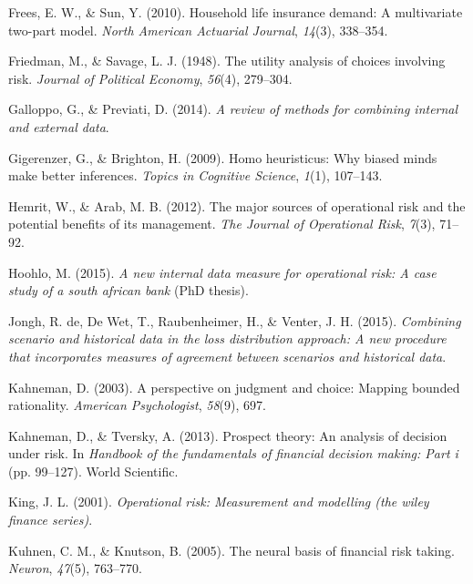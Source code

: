 \documentclass{DissertateUSU}
\begin{document}
\leavevmode\hypertarget{ref-frees2010household}{}%
Frees, E. W., \& Sun, Y. (2010). Household life insurance demand: A
multivariate two-part model. \emph{North American Actuarial Journal},
\emph{14}(3), 338--354.

\leavevmode\hypertarget{ref-friedman1948utility}{}%
Friedman, M., \& Savage, L. J. (1948). The utility analysis of choices
involving risk. \emph{Journal of Political Economy}, \emph{56}(4),
279--304.

\leavevmode\hypertarget{ref-galloppo2014review}{}%
Galloppo, G., \& Previati, D. (2014). \emph{A review of methods for
combining internal and external data}.

\leavevmode\hypertarget{ref-gigerenzer2009homo}{}%
Gigerenzer, G., \& Brighton, H. (2009). Homo heuristicus: Why biased
minds make better inferences. \emph{Topics in Cognitive Science},
\emph{1}(1), 107--143.

\leavevmode\hypertarget{ref-hemrit2012major}{}%
Hemrit, W., \& Arab, M. B. (2012). The major sources of operational risk
and the potential benefits of its management. \emph{The Journal of
Operational Risk}, \emph{7}(3), 71--92.

\leavevmode\hypertarget{ref-hoohlo2015new}{}%
Hoohlo, M. (2015). \emph{A new internal data measure for operational
risk: A case study of a south african bank} (PhD thesis).

\leavevmode\hypertarget{ref-de2015combining}{}%
Jongh, R. de, De Wet, T., Raubenheimer, H., \& Venter, J. H. (2015).
\emph{Combining scenario and historical data in the loss distribution
approach: A new procedure that incorporates measures of agreement
between scenarios and historical data}.

\leavevmode\hypertarget{ref-kahneman2003perspective}{}%
Kahneman, D. (2003). A perspective on judgment and choice: Mapping
bounded rationality. \emph{American Psychologist}, \emph{58}(9), 697.

\leavevmode\hypertarget{ref-kahneman2013prospect}{}%
Kahneman, D., \& Tversky, A. (2013). Prospect theory: An analysis of
decision under risk. In \emph{Handbook of the fundamentals of financial
decision making: Part i} (pp. 99--127). World Scientific.

\leavevmode\hypertarget{ref-king2001operational}{}%
King, J. L. (2001). \emph{Operational risk: Measurement and modelling
(the wiley finance series)}.

\leavevmode\hypertarget{ref-kuhnen2005neural}{}%
Kuhnen, C. M., \& Knutson, B. (2005). The neural basis of financial risk
taking. \emph{Neuron}, \emph{47}(5), 763--770.
\end{document}

